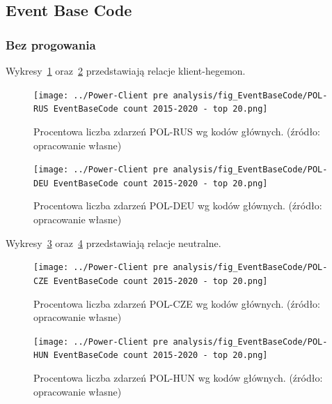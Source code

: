 \documentclass[11pt]{report}
\begin{document}
    \subsection{Event Base Code}

    \subsubsection{Bez progowania}\label{subsubsec:ebc:bez-progowania}

    Wykresy~\ref{fig:Power-Client:EBC:POL-RUS} oraz~\ref{fig:Power-Client:EBC:POL-DEU} przedstawiają relacje klient-hegemon.

    \begin{figure}[!htp]
        \centering
        \texttt{[image: ../Power-Client pre analysis/fig\_EventBaseCode/POL-RUS EventBaseCode count 2015-2020 - top 20.png]}
        \caption{Procentowa liczba zdarzeń POL-RUS wg kodów głównych. (źródło: opracowanie własne)}
        \label{fig:Power-Client:EBC:POL-RUS}
    \end{figure}

    \begin{figure}[!htp]
        \centering
        \texttt{[image: ../Power-Client pre analysis/fig\_EventBaseCode/POL-DEU EventBaseCode count 2015-2020 - top 20.png]}
        \caption{Procentowa liczba zdarzeń POL-DEU wg kodów głównych. (źródło: opracowanie własne)}
        \label{fig:Power-Client:EBC:POL-DEU}
    \end{figure}

    Wykresy~\ref{fig:Power-Client:EBC:POL-CZE} oraz~\ref{fig:Power-Client:EBC:POL-HUN} przedstawiają relacje neutralne.

    \begin{figure}[!htp]
        \centering
        \texttt{[image: ../Power-Client pre analysis/fig\_EventBaseCode/POL-CZE EventBaseCode count 2015-2020 - top 20.png]}
        \caption{Procentowa liczba zdarzeń POL-CZE wg kodów głównych. (źródło: opracowanie własne)}
        \label{fig:Power-Client:EBC:POL-CZE}
    \end{figure}

    \begin{figure}[!htp]
        \centering
        \texttt{[image: ../Power-Client pre analysis/fig\_EventBaseCode/POL-HUN EventBaseCode count 2015-2020 - top 20.png]}
        \caption{Procentowa liczba zdarzeń POL-HUN wg kodów głównych. (źródło: opracowanie własne)}
        \label{fig:Power-Client:EBC:POL-HUN}
    \end{figure}
\end{document}
